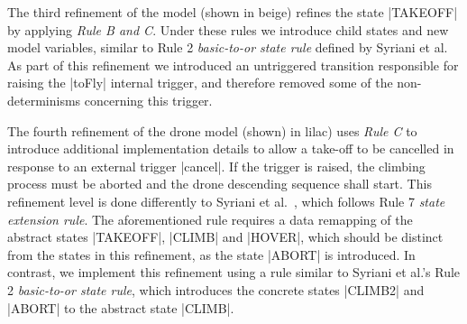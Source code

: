 The third refinement of the model (shown in beige) refines the state |TAKEOFF| by applying \emph{Rule B and C}. 
Under these rules we introduce child states and new model variables, similar to Rule 2 \emph{basic-to-or state rule} defined by Syriani et al.~\cite{Syriani_2019}
As part of this refinement we introduced an untriggered transition responsible for raising the |toFly| internal trigger, and therefore removed some of the non-determinisms concerning this trigger.

The fourth refinement of the drone model (shown) in lilac) uses \emph{Rule C} to introduce additional implementation details to 
allow a take-off to be cancelled in response to an external trigger |cancel|.
If the trigger is raised, the climbing process must be aborted and the drone descending sequence shall start. 
This refinement level is done differently to Syriani et al.~\cite{Syriani_2019}, which follows Rule 7 \emph{state extension rule}. 
The aforementioned rule requires a data remapping of the abstract states |TAKEOFF|, |CLIMB| and |HOVER|, which should be distinct from the states in this  refinement, as the state |ABORT| is introduced.
In contrast, we implement this refinement using a rule similar to Syriani et al.'s  Rule 2 \emph{basic-to-or state rule}, which introduces the concrete states |CLIMB2| and |ABORT| to the abstract state |CLIMB|.




